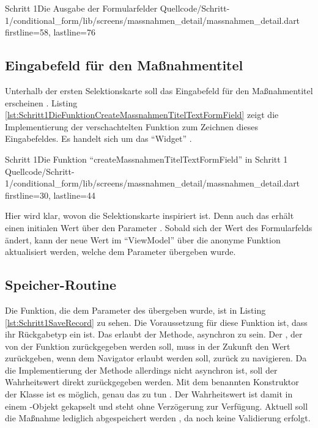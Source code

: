 \begin{alexlisting}{Schritt 1}{Die Ausgabe der Formularfelder}
  {Quellcode/Schritt-1/conditional_form/lib/screens/massnahmen_detail/massnahmen_detail.dart}
  {firstline=58, lastline=76}
  \label{lst:Schritt1AusgabeDerFormularfelder}
\end{alexlisting}

\subsection{Eingabefeld für den Maßnahmentitel}


Unterhalb der ersten Selektionskarte soll das Eingabefeld für den Maßnahmentitel erscheinen .
Listing \ref{lst:Schritt1DieFunktionCreateMassnahmenTitelTextFormField} zeigt die Implementierung der verschachtelten Funktion zum Zeichnen dieses Eingabefeldes.
 Es handelt sich um das \enquote{Widget}  .


\begin{alexlisting}{Schritt 1}{Die Funktion \enquote{createMassnahmenTitelTextFormField} in Schritt 1}
  {Quellcode/Schritt-1/conditional_form/lib/screens/massnahmen_detail/massnahmen_detail.dart}
  {firstline=30, lastline=44}
  \label{lst:Schritt1DieFunktionCreateMassnahmenTitelTextFormField}
\end{alexlisting}

Hier wird klar, wovon die Selektionskarte inspiriert ist.
Denn auch das  erhält einen initialen Wert über den Parameter .
Sobald sich der Wert des Formularfelds ändert, kann der neue Wert im \enquote{ViewModel} über die anonyme Funktion aktualisiert werden, welche dem Parameter  übergeben wurde.

\subsection{Speicher-Routine}


Die Funktion, die dem Parameter  des  übergeben wurde, ist in Listing \ref{lst:Schritt1SaveRecord} zu sehen.
Die Voraussetzung für diese Funktion ist, dass ihr Rückgabetyp ein  ist.
Das erlaubt der Methode, asynchron zu sein.
Der , der von der Funktion zurückgegeben werden soll, muss in der Zukunft den Wert  zurückgeben, wenn dem Navigator erlaubt  werden soll, zurück zu navigieren.
Da die Implementierung der Methode allerdings nicht asynchron ist, soll der Wahrheitswert direkt zurückgegeben werden.
Mit dem benannten Konstruktor  der Klasse  ist es möglich, genau das zu tun .
 Der Wahrheitswert ist damit in einem -Objekt gekapselt und steht ohne Verzögerung zur Verfügung.
Aktuell soll die Maßnahme lediglich abgespeichert werden , da noch keine Validierung erfolgt.

